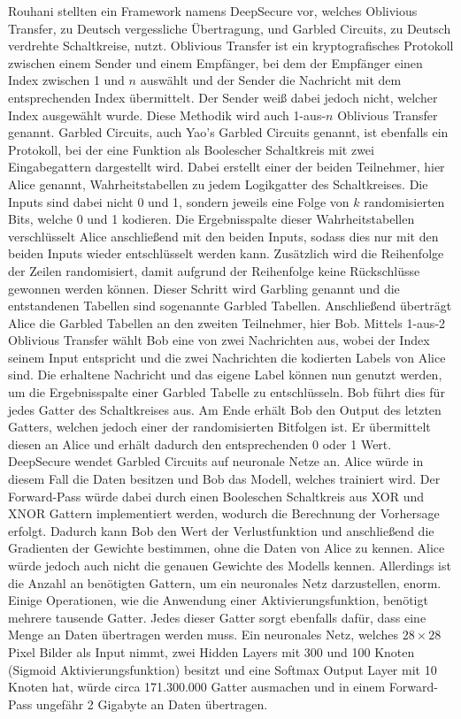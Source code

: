 Rouhani \etal \cite{P-71} stellten ein Framework namens DeepSecure vor, welches Oblivious Transfer, zu Deutsch vergessliche Übertragung, und Garbled Circuits, zu Deutsch verdrehte Schaltkreise, nutzt.
Oblivious Transfer ist ein kryptografisches Protokoll zwischen einem Sender und einem Empfänger, bei dem der Empfänger einen Index zwischen 1 und $n$ auswählt und der Sender die Nachricht mit dem entsprechenden Index übermittelt. 
Der Sender weiß dabei jedoch nicht, welcher Index ausgewählt wurde.
Diese Methodik wird auch 1-aus-$n$ Oblivious Transfer genannt.
Garbled Circuits, auch Yao's Garbled Circuits genannt, ist ebenfalls ein Protokoll, bei der eine Funktion als Boolescher Schaltkreis mit zwei Eingabegattern dargestellt wird.
Dabei erstellt einer der beiden Teilnehmer, hier Alice genannt, Wahrheitstabellen zu jedem Logikgatter des Schaltkreises. 
Die Inputs sind dabei nicht 0 und 1, sondern jeweils eine Folge von $k$ randomisierten Bits, welche 0 und 1 kodieren.
Die Ergebnisspalte dieser Wahrheitstabellen verschlüsselt Alice anschließend mit den beiden Inputs, sodass dies nur mit den beiden Inputs wieder entschlüsselt werden kann. 
Zusätzlich wird die Reihenfolge der Zeilen randomisiert, damit aufgrund der Reihenfolge keine Rückschlüsse gewonnen werden können. 
Dieser Schritt wird Garbling genannt und die entstandenen Tabellen sind sogenannte Garbled Tabellen.
Anschließend überträgt Alice die Garbled Tabellen an den zweiten Teilnehmer, hier Bob.
Mittels 1-aus-2 Oblivious Transfer wählt Bob eine von zwei Nachrichten aus, wobei der Index seinem Input entspricht und die zwei Nachrichten die kodierten Labels von Alice sind.
Die erhaltene Nachricht und das eigene Label können nun genutzt werden, um die Ergebnisspalte einer Garbled Tabelle zu entschlüsseln.
Bob führt dies für jedes Gatter des Schaltkreises aus.
Am Ende erhält Bob den Output des letzten Gatters, welchen jedoch einer der randomisierten Bitfolgen ist. 
Er übermittelt diesen an Alice und erhält dadurch den entsprechenden 0 oder 1 Wert.
DeepSecure wendet Garbled Circuits auf neuronale Netze an.
Alice würde in diesem Fall die Daten besitzen und Bob das Modell, welches trainiert wird.
Der Forward-Pass würde dabei durch einen Booleschen Schaltkreis aus XOR und XNOR Gattern implementiert werden, wodurch die Berechnung der Vorhersage erfolgt.
Dadurch kann Bob den Wert der Verlustfunktion und anschließend die Gradienten der Gewichte bestimmen, ohne die Daten von Alice zu kennen.
Alice würde jedoch auch nicht die genauen Gewichte des Modells kennen.
Allerdings ist die Anzahl an benötigten Gattern, um ein neuronales Netz darzustellen, enorm.
Einige Operationen, wie die Anwendung einer Aktivierungsfunktion, benötigt mehrere tausende Gatter.
Jedes dieser Gatter sorgt ebenfalls dafür, dass eine Menge an Daten übertragen werden muss.
Ein neuronales Netz, welches $28\times28$ Pixel Bilder als Input nimmt, zwei Hidden Layers mit 300 und 100 Knoten (Sigmoid Aktivierungsfunktion) besitzt und eine Softmax Output Layer mit 10 Knoten hat, würde circa 171.300.000 Gatter ausmachen und in einem Forward-Pass ungefähr 2 Gigabyte an Daten übertragen.

